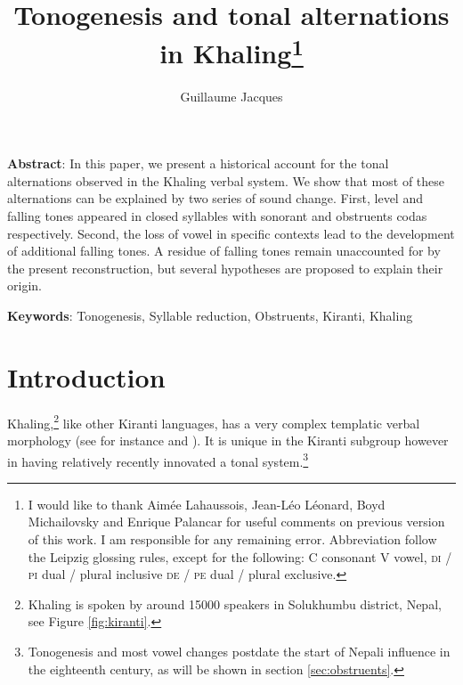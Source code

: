 \documentclass[oldfontcommands,oneside,a4paper,11pt]{article}
\begin{document}
 

\title{Tonogenesis and tonal alternations in Khaling\footnote{I would like to thank Aimée Lahaussois, Jean-Léo Léonard,  Boyd Michailovsky and Enrique Palancar  for useful comments on previous version of this work. I am responsible for any remaining error. Abbreviation follow the Leipzig glossing rules, except for the following: C consonant V vowel, \textsc{di} / \textsc{pi} dual / plural inclusive \textsc{de} / \textsc{pe} dual / plural exclusive.}}
\author{Guillaume Jacques }
\maketitle
\linenumbers

\sloppy


\textbf{Abstract}: In this paper, we present a historical account for the tonal alternations observed in the Khaling verbal system. We show that most of these alternations can be explained by two series of sound change. First, level and falling tones   appeared in closed syllables with sonorant and obstruents codas respectively. Second, the loss of vowel in specific contexts   lead to the development of additional falling tones. A residue of falling tones remain unaccounted for by the present reconstruction, but several hypotheses are proposed to explain their origin.

\textbf{Keywords}: Tonogenesis, Syllable reduction, Obstruents, Kiranti, Khaling
 
 \section{Introduction}
Khaling,\footnote{Khaling is spoken by around 15000 speakers in Solukhumbu district, Nepal, see Figure \ref{fig:kiranti}.} like other Kiranti languages, has a very complex templatic verbal morphology (see for instance \citealt{bickel07chintang} and \citealt{jacques12agreement}). It is unique in the Kiranti subgroup however in having relatively recently innovated a tonal system.\footnote{Tonogenesis and most vowel changes postdate the start of Nepali influence in the eighteenth century, as will be shown in section \ref{sec:obstruents}.} 
\end{document}
